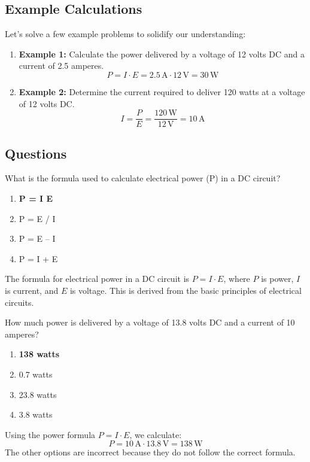 \subsection*{Example Calculations}
Let's solve a few example problems to solidify our understanding:
\begin{enumerate}
    \item \textbf{Example 1:} Calculate the power delivered by a voltage of 12 volts DC and a current of 2.5 amperes.
    \[
    P = I \cdot E = 2.5 \, \text{A} \cdot 12 \, \text{V} = 30 \, \text{W}
    \]
    \item \textbf{Example 2:} Determine the current required to deliver 120 watts at a voltage of 12 volts DC.
    \[
    I = \frac{P}{E} = \frac{120 \, \text{W}}{12 \, \text{V}} = 10 \, \text{A}
    \]
\end{enumerate}

\subsection*{Questions}
\begin{tcolorbox}[colback=gray!10!white,colframe=black!75!black,title={T5C08}]
    What is the formula used to calculate electrical power (P) in a DC circuit?
    \begin{enumerate}[label=\Alph*,noitemsep]
        \item \textbf{P = I E}
        \item P = E / I
        \item P = E – I
        \item P = I + E
    \end{enumerate}
\end{tcolorbox}
The formula for electrical power in a DC circuit is \( P = I \cdot E \), where \( P \) is power, \( I \) is current, and \( E \) is voltage. This is derived from the basic principles of electrical circuits.


\begin{tcolorbox}[colback=gray!10!white,colframe=black!75!black,title={T5C09}]
    How much power is delivered by a voltage of 13.8 volts DC and a current of 10 amperes?
    \begin{enumerate}[label=\Alph*,noitemsep]
        \item \textbf{138 watts}
        \item 0.7 watts
        \item 23.8 watts
        \item 3.8 watts
    \end{enumerate}
\end{tcolorbox}
Using the power formula \( P = I \cdot E \), we calculate:
\[
P = 10 \, \text{A} \cdot 13.8 \, \text{V} = 138 \, \text{W}
\]
The other options are incorrect because they do not follow the correct formula.

